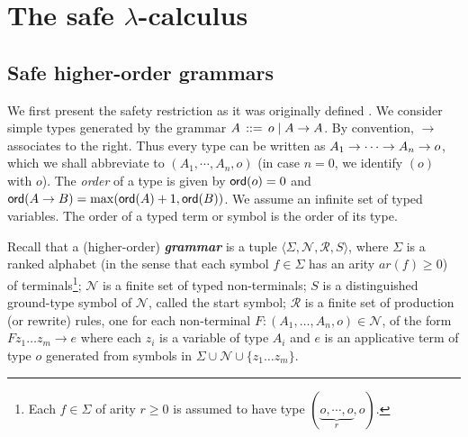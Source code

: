 \documentclass{llncs}
\newcommand\defname[1]{{\bf\em #1}\index{#1}}
\newcommand\union{\cup}
\begin{document}






\section{The safe $\lambda$-calculus}

\subsection*{Safe higher-order grammars}
We first present the safety restriction as it was originally defined
\cite{KNU02}. We consider simple types generated by the grammar $A \,
::= \, o \; | \; A \rightarrow A$. By convention, $\rightarrow$ associates
to the right. Thus every type can be written as $A_1 \rightarrow \cdots
\rightarrow A_n \rightarrow o$, which we shall abbreviate to $(A_1, \cdots,
A_n, o)$ (in case $n = 0$, we identify $(o)$ with $o$). The
\emph{order} of a type is given by ${\sf ord}(o) = 0$ and ${\sf ord}(A \rightarrow
  B) = \max({\sf ord}(A)+1, {\sf ord}(B))$. We assume an infinite set of typed
variables. The order of a typed term or symbol is the order of its
type.

Recall that a (higher-order) \defname{grammar} is a tuple $\langle
\Sigma, \mathcal{N}, \mathcal{R}, S \rangle$, where $\Sigma$ is a
ranked alphabet (in the sense that each symbol $f \in \Sigma$ has an
arity $\mathit{ar}(f) \geq 0$) of terminals\footnote{Each $f \in
  \Sigma$ of arity $r \geq 0$ is assumed to have type $(\underbrace{o,
    \cdots, o}_r, o)$.}; $\mathcal{N}$ is a finite set of typed
non-terminals; $S$ is a distinguished ground-type symbol of
$\mathcal{N}$, called the start symbol; $\mathcal{R}$ is a finite set
of production (or rewrite) rules, one for each non-terminal $F : (A_1,
\ldots, A_n, o) \in \mathcal{N}$, of the form $ F z_1 \ldots z_m
\rightarrow e$ where each $z_i$ is a variable of type $A_i$ and $e$ is
an applicative term of type $o$ generated from symbols in $\Sigma
\union \mathcal{N} \union \{z_1 \ldots z_m \}$.
\end{document}
